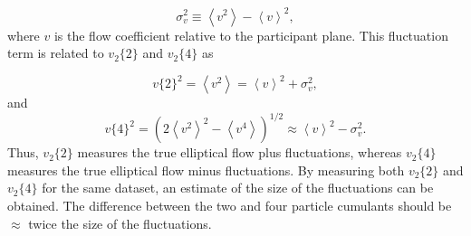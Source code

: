 \begin{equation}
  \sigma_v^2 \equiv \left<v^2\right> - \left<v\right>^2,
\end{equation}
where $v$ is the flow coefficient relative to the participant plane. This fluctuation term is related to  $v_2\{2\}$ and $v_2\{4\}$ as 

\begin{equation}
v\{2\}^2 = \left<v^2\right> =  \left<v\right>^2 + \sigma_v^2,
\end{equation}
and
\begin{equation}
v\{4\}^2 = (2 \left<v^2\right>^2-\left<v^4\right>)^{1/2} \approx  \left<v\right>^2 -  \sigma_v^2.
\end{equation}
Thus, $v_2\{2\}$ measures the true elliptical flow plus fluctuations, whereas $v_2\{4\}$ measures the true elliptical flow minus fluctuations. By measuring both $v_2\{2\}$ and $v_2\{4\}$ for the same dataset, an estimate of the size of the fluctuations can be obtained. The difference between the two and four particle cumulants should be $\approx$ twice the size of the fluctuations.

